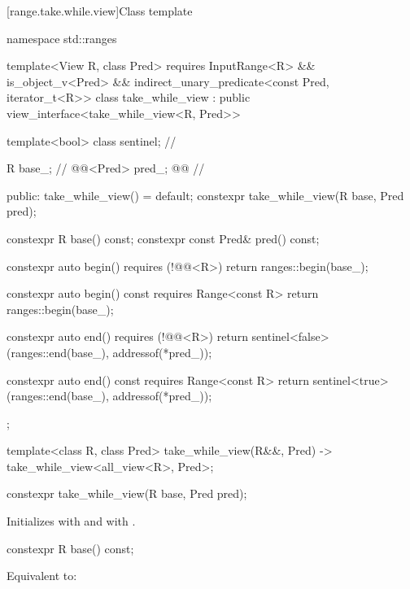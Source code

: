 [range.take.while.view]{Class template }

\begin{codeblock}
namespace std::ranges {
  template<View R, class Pred>
  requires InputRange<R> && is_object_v<Pred> &&
    indirect_unary_predicate<const Pred, iterator_t<R>>
  class take_while_view : public view_interface<take_while_view<R, Pred>> {
    template<bool> class sentinel;                      // \expos

    R base_;                                            // \expos
    @@<Pred> pred_; @\itcorr[-1]@                       // \expos

  public:
    take_while_view() = default;
    constexpr take_while_view(R base, Pred pred);

    constexpr R base() const;
    constexpr const Pred& pred() const;

    constexpr auto begin() requires (!@@<R>)
    { return ranges::begin(base_); }

    constexpr auto begin() const requires Range<const R>
    { return ranges::begin(base_); }

    constexpr auto end() requires (!@@<R>)
    { return sentinel<false>(ranges::end(base_), addressof(*pred_)); }

    constexpr auto end() const requires Range<const R>
    { return sentinel<true>(ranges::end(base_), addressof(*pred_)); }
  };

  template<class R, class Pred>
    take_while_view(R&&, Pred) -> take_while_view<all_view<R>, Pred>;
}
\end{codeblock}

\begin{itemdecl}
constexpr take_while_view(R base, Pred pred);
\end{itemdecl}

\begin{itemdescr}
\pnum
\effects
Initializes  with  and
 with .
\end{itemdescr}

\begin{itemdecl}
constexpr R base() const;
\end{itemdecl}

\begin{itemdescr}
\pnum
\effects
Equivalent to: 
\end{itemdescr}

